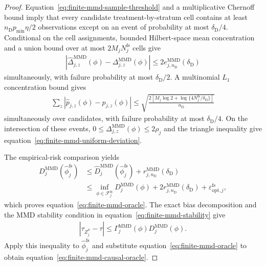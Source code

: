 \begin{proof}
Equation~\eqref{eq:finite-mmd-sample-threshold} and a multiplicative Chernoff bound imply that every candidate treatment-by-stratum cell contains at least $n_{\mathrm D}p_{\min}\eta/2$ observations except on an event of probability at most $\delta_{\mathrm D}/4$. Conditional on the cell assignments, bounded Hilbert-space mean concentration and a union bound over at most $2M_jN_j^{\mathrm{fs}}$ cells give
\begin{align}
\left|
\widehat\Delta_{j,z}^{\mathrm{MMD}}(\phi)
-\Delta_{j,z}^{\mathrm{MMD}}(\phi)
\right|
\le
2e_{j,n_{\mathrm D}}^{\mathrm{MMD}}(\delta_{\mathrm D})
\end{align}
simultaneously, with failure probability at most $\delta_{\mathrm D}/2$. A multinomial $L_1$ concentration bound gives
\begin{align}
\sum_z|\widehat p_{j,z}(\phi)-p_{j,z}(\phi)|
\le
\sqrt{
\frac{
2\left[M_j\log2+\log\{4N_j^{\mathrm{fs}}/\delta_{\mathrm D}\}\right]
}{n_{\mathrm D}}
}
\end{align}
simultaneously over candidates, with failure probability at most $\delta_{\mathrm D}/4$. On the intersection of these events, $0\le\Delta_{j,z}^{\mathrm{MMD}}(\phi)\le2\rho_j$ and the triangle inequality give equation~\eqref{eq:finite-mmd-uniform-deviation}.

The empirical-risk comparison yields
\begin{align}
D_j^{\mathrm{MMD}}(\widehat\phi_j^{\mathrm{fs}})
&\le
\widehat D_j^{\mathrm{MMD}}(\widehat\phi_j^{\mathrm{fs}})
+r_{j,n_{\mathrm D}}^{\mathrm{MMD}}(\delta_{\mathrm D})\\
&\le
\inf_{\phi\in\mathcal F_j^{\mathrm{fs}}}
D_j^{\mathrm{MMD}}(\phi)
+2r_{j,n_{\mathrm D}}^{\mathrm{MMD}}(\delta_{\mathrm D})
+\varepsilon_{\mathrm{opt},j}^{\mathrm{fs}},
\end{align}
which proves equation~\eqref{eq:finite-mmd-oracle}. The exact bias decomposition and the MMD stability condition in equation~\eqref{eq:finite-mmd-stability} give
\begin{align}
|\tau_{Z_j^\phi}-\tau|
\le
\Gamma_j^{\mathrm{MMD}}(\phi)D_j^{\mathrm{MMD}}(\phi).
\end{align}
Apply this inequality to $\widehat\phi_j^{\mathrm{fs}}$ and substitute equation~\eqref{eq:finite-mmd-oracle} to obtain equation~\eqref{eq:finite-mmd-causal-oracle}.
\end{proof}

